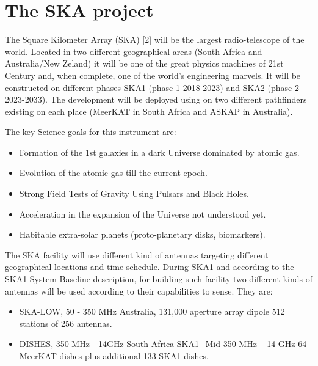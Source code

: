 \documentclass[review]{elsarticle}
\begin{document}
\section{The SKA project}

The Square Kilometer Array (SKA) [2] will be the largest radio-telescope of the world. Located in two different geographical areas (South-Africa and Australia/New Zeland) it will be one of the great physics machines of 21st Century and, when complete, one of the world’s engineering marvels. It will be constructed on different phases SKA1 (phase 1 2018-2023) and SKA2 (phase 2 2023-2033). The development will be deployed using on two different pathfinders  existing on each place (MeerKAT in South Africa and ASKAP in Australia). 

The key Science goals for this instrument are:

\begin{itemize}
	\item {Formation of the 1st galaxies in a dark Universe dominated by atomic gas.}
	\item {Evolution of the atomic gas till the current epoch.}
	\item {Strong Field Tests of Gravity Using Pulsars and Black Holes.}
	\item {Acceleration in the expansion of the Universe not understood yet.}
	\item {Habitable extra-solar planets (proto-planetary disks, biomarkers).}
\end{itemize}

The SKA facility will use different kind of antennas targeting different geographical locations and time schedule. During SKA1 and according to the SKA1 System Baseline description, for building such facility two different kinds of antennas will be used according to their capabilities to sense. They are: 

\begin{itemize}
	\item {SKA-LOW, 50 - 350 MHz Australia, 131,000 aperture array dipole 512 stations of 256 antennas.}
	\item {DISHES, 350 MHz - 14GHz South-Africa SKA1\_Mid 350 MHz – 14 GHz 64 MeerKAT dishes plus additional 133 SKA1 dishes.}
\end{itemize}
\end{document}
